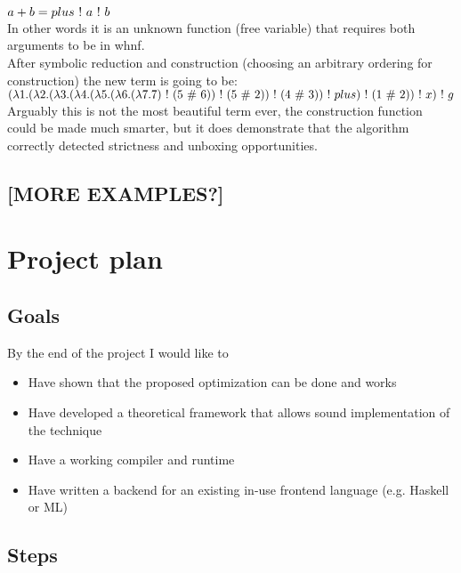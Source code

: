 \documentclass[a4paper]{article}
\begin{document}
$a + b = plus \ !\  a \ !\  b$\\

In other words it is an unknown function (free variable) that requires both arguments to be in whnf.\\

After symbolic reduction and construction (choosing an arbitrary ordering for construction) the new term is going to be:\\

$(\lambda 1.(\lambda 2.(\lambda 3.(\lambda 4.(\lambda 5.(\lambda 6.(\lambda 7.7) \ !\  (5 \ \#\  6)) \ !\  (5 \ \#\  2)) \ !\  (4 \ \#\  3)) \ !\  plus) \ !\  (1 \ \#\  2)) \ !\  x) \ !\  g$\\

Arguably this is not the most beautiful term ever, the construction function could be made much smarter, but it does demonstrate that the algorithm correctly detected strictness and unboxing opportunities.

\subsection{[MORE EXAMPLES?]}

\section{Project plan}

\subsection{Goals}

By the end of the project I would like to

\begin{itemize}
\item Have shown that the proposed optimization can be done and works
\item Have developed a theoretical framework that allows sound implementation of the technique
\item Have a working compiler and runtime
\item Have written a backend for an existing in-use frontend language (e.g. Haskell or ML)
\end{itemize}

\subsection{Steps}
\end{document}
